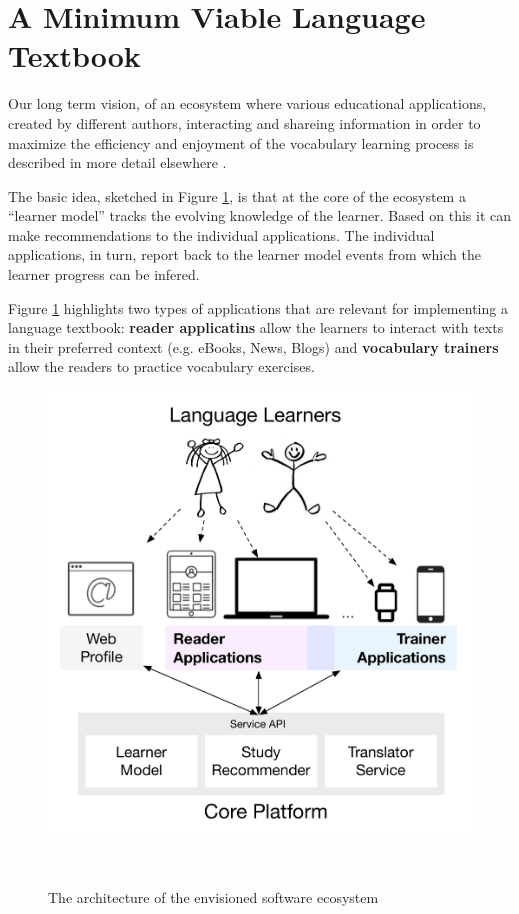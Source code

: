
\newpage
\section{A Minimum Viable Language Textbook}
\label{sec:system}

Our long term vision, of an ecosystem where various educational applications, created by different authors, interacting and shareing information in order to maximize the efficiency and enjoyment of the vocabulary learning process is described in more detail elsewhere \cite{Lungu16}. 

The basic idea, sketched in Figure \ref{fig:architecture}, is that at the core of the ecosystem a ``learner model'' tracks the evolving knowledge of the learner. Based on this it can make recommendations to the individual applications. The individual applications, in turn, report back to the learner model events from which the learner progress can be infered. 

Figure \ref{fig:architecture} highlights two types of applications that are relevant for implementing a language textbook: {\bf reader applicatins} allow the learners to interact with texts in their preferred context (e.g. eBooks, News, Blogs) and {\bf vocabulary trainers} allow the readers to practice vocabulary exercises. 

\begin{figure}[h!]
\centering
  \includegraphics[width=0.8\columnwidth]{figures/zeeguu-architecture.pdf}
  \caption{The architecture of the envisioned software ecosystem}~\label{fig:architecture}
\end{figure}



